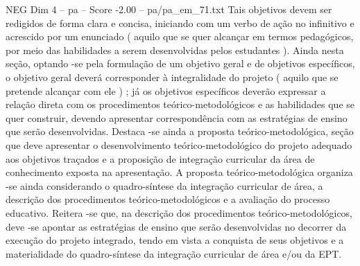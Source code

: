 \begin{textsample}{NEG Dim 4 – pa – Score -2.00 – pa/pa\_em\_71.txt}
Tais objetivos devem ser redigidos de forma clara e concisa, iniciando com um verbo de ação no infinitivo e acrescido por um enunciado ( aquilo que se quer alcançar em termos pedagógicos, por meio das habilidades a serem desenvolvidas pelos estudantes ).
Ainda nesta seção, optando -se pela formulação de um objetivo geral e de objetivos específicos, o objetivo geral deverá corresponder à integralidade do projeto ( aquilo que se pretende alcançar com ele ) ; já os objetivos específicos deverão expressar a relação direta com os procedimentos teórico-metodológicos e as habilidades que se quer construir, devendo apresentar correspondência com as estratégias de ensino que serão desenvolvidas.
Destaca -se ainda a proposta teórico-metodológica, seção que deve apresentar o desenvolvimento teórico-metodológico do projeto adequado aos objetivos traçados e a proposição de integração curricular da área de conhecimento exposta na apresentação.
A proposta teórico-metodológica organiza -se ainda considerando o quadro-síntese da integração curricular de área, a descrição dos procedimentos teórico-metodológicos e a avaliação do processo educativo.
Reitera -se que, na descrição dos procedimentos teórico-metodológicos, deve -se apontar as estratégias de ensino que serão desenvolvidas no decorrer da execução do projeto integrado, tendo em vista a conquista de seus objetivos e a materialidade do quadro-síntese da integração curricular de área e/ou da EPT.

\end{textsample}
